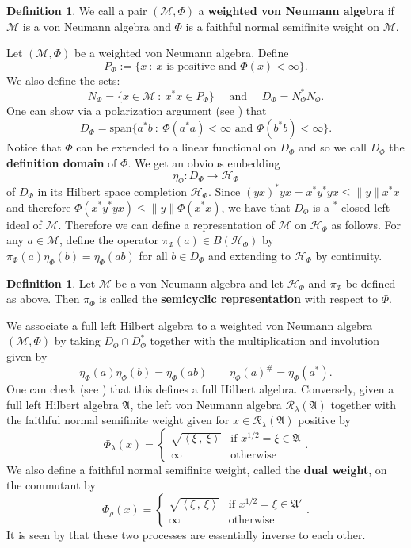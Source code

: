 \documentclass[12pt]{amsart}
\theoremstyle{definition}
\newtheorem{defn}[thm]{Definition}
\def\cal{\mathcal}
\newcommand\ip[2]{\left\langle #1\, ,\!\ #2 \right\rangle}
\newcommand\R{{\cal R}}
\begin{document}
\begin{defn}
    We call a pair $(\cal M, \Phi)$ a \textbf{weighted von Neumann algebra} if $\cal M$ is a von Neumann algebra and $\Phi$ is a faithful normal semifinite weight on $\cal M$.
\end{defn}

Let $(\cal M, \Phi)$ be a weighted von Neumann algebra.  Define
\[
P_{\Phi} := \{x \ : \ x \text{ is positive and } \Phi(x) < \infty\}.
\]
We also define the sets:
\[
    N_\Phi = \{x \in \cal M \ : \ x^*x\in P_\Phi\} \quad \text{ and } \quad D_\Phi = N_\Phi^*N_\Phi.
\]
One can show via a polarization argument (see \cite{Takesaki}) that
\[
    D_\Phi = \mathrm{span}\{a^*b \ : \ \Phi(a^*a) < \infty \text{ and }  \Phi(b^*b) < \infty \}.
\]
Notice that $\Phi$ can be extended to a linear functional on $D_\Phi$ and so we call $D_\Phi$ the \textbf{definition domain} of $\Phi$.  We get an obvious embedding
\[
    \eta_\Phi: D_\Phi \to \cal H_{\Phi}
\]
of $D_\Phi$ in its Hilbert space completion $\cal H_{\Phi}$.  Since $(yx)^*yx = x^*y^*yx \leq \|y\|x^*x$ and therefore $\Phi(x^*y^*yx) \leq \|y\|\Phi(x^*x)$, we have that $D_\Phi$ is a $^*$-closed left ideal of $\cal M$.  Therefore we can define a representation of $\cal M$ on $\cal H_{\Phi}$ as follows.  For any $a \in \cal M$, define the operator $\pi_{\Phi}(a) \in B(\cal H_{\Phi})$ by $\pi_{\Phi}(a)\eta_\Phi(b) = \eta_\Phi(ab)$ for all $b \in D_\Phi$ and extending to $\cal H_{\Phi}$ by continuity.

\begin{defn}
    Let $\cal M$ be a von Neumann algebra and let $\cal H_{\Phi}$ and $\pi_{\Phi}$ be defined as above.  Then $\pi_{\Phi}$ is called the \textbf{semicyclic representation} with respect to $\Phi$.
\end{defn}

We associate a full left Hilbert algebra to a weighted von Neumann algebra $(\cal M, \Phi)$ by taking $D_\Phi \cap D_\Phi^*$ together with the multiplication and involution given by
\[
    \eta_{\Phi}(a)\eta_{\Phi}(b) = \eta_{\Phi}(ab) \qquad \eta_{\Phi}(a)^\# = \eta_{\Phi}(a^*).
\]
One can check (see \cite{Takesaki}) that this defines a full Hilbert algebra.  Conversely, given a full left Hilbert algebra $\mathfrak{A}$, the left von Neumann algebra $\R_{\lambda}(\mathfrak{A})$ together with the faithful normal semifinite weight given for $x \in \R_{\lambda}(\mathfrak{A})$ positive by
\[
    \Phi_{\lambda}(x) = \begin{cases} 
      \sqrt{\ip{\xi}{\xi}} & \text{if } x^{1/2} = \xi \in \mathfrak{A} \\
      \infty & \text{otherwise }
    \end{cases}.
\]
We also define a faithful normal semifinite weight, called the \textbf{dual weight}, on the commutant by
\[
    \Phi_{\rho}(x) = \begin{cases} 
      \sqrt{\ip{\xi}{\xi}} & \text{if } x^{1/2} = \xi \in \mathfrak{A}' \\
      \infty & \text{otherwise }
    \end{cases}.
\]
It is seen by \cite[Chapter VII, Theorem 2.5 and Theorem 2.6]{Takesaki} that these two processes are essentially inverse to each other.
\end{document}
